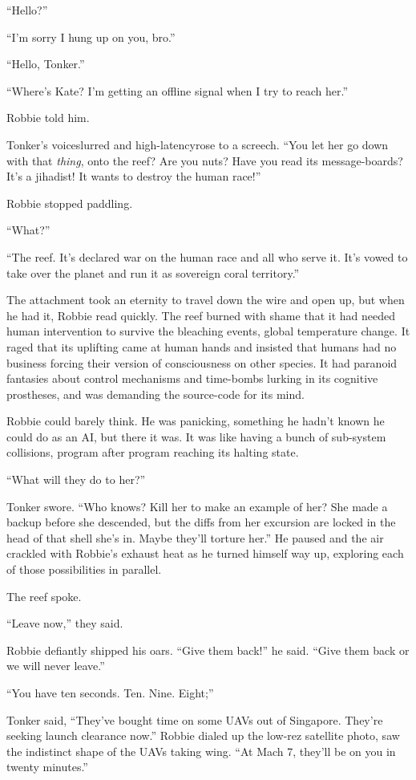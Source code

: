 “Hello?”

“I’m sorry I hung up on you, bro.”

“Hello, Tonker.”

“Where’s Kate? I’m getting an offline signal when I try to reach
her.”

Robbie told him.

Tonker’s voice\dash{}slurred and high-latency\dash{}rose to a screech. “You let
her go down with that \emph{thing}, onto the reef? Are you nuts?
Have you read its message-boards? It’s a jihadist! It wants to
destroy the human race!”

Robbie stopped paddling.

“What?”

“The reef. It’s declared war on the human race and all who serve
it. It’s vowed to take over the planet and run it as sovereign
coral territory.”

The attachment took an eternity to travel down the wire and open
up, but when he had it, Robbie read quickly. The reef burned with
shame that it had needed human intervention to survive the
bleaching events, global temperature change. It raged that its
uplifting came at human hands and insisted that humans had no
business forcing their version of consciousness on other species.
It had paranoid fantasies about control mechanisms and time-bombs
lurking in its cognitive prostheses, and was demanding the
source-code for its mind.

Robbie could barely think. He was panicking, something he hadn’t
known he could do as an AI, but there it was. It was like having a
bunch of sub-system collisions, program after program reaching its
halting state.

“What will they do to her?”

Tonker swore. “Who knows? Kill her to make an example of her? She
made a backup before she descended, but the diffs from her
excursion are locked in the head of that shell she’s in. Maybe
they’ll torture her.” He paused and the air crackled with Robbie’s
exhaust heat as he turned himself way up, exploring each of those
possibilities in parallel.

The reef spoke.

“Leave now,” they said.

Robbie defiantly shipped his oars. “Give them back!” he said. “Give
them back or we will never leave.”

“You have ten seconds. Ten. Nine. Eight;”

Tonker said, “They’ve bought time on some UAVs out of Singapore.
They’re seeking launch clearance now.” Robbie dialed up the low-rez
satellite photo, saw the indistinct shape of the UAVs taking wing.
“At Mach 7, they’ll be on you in twenty minutes.”

